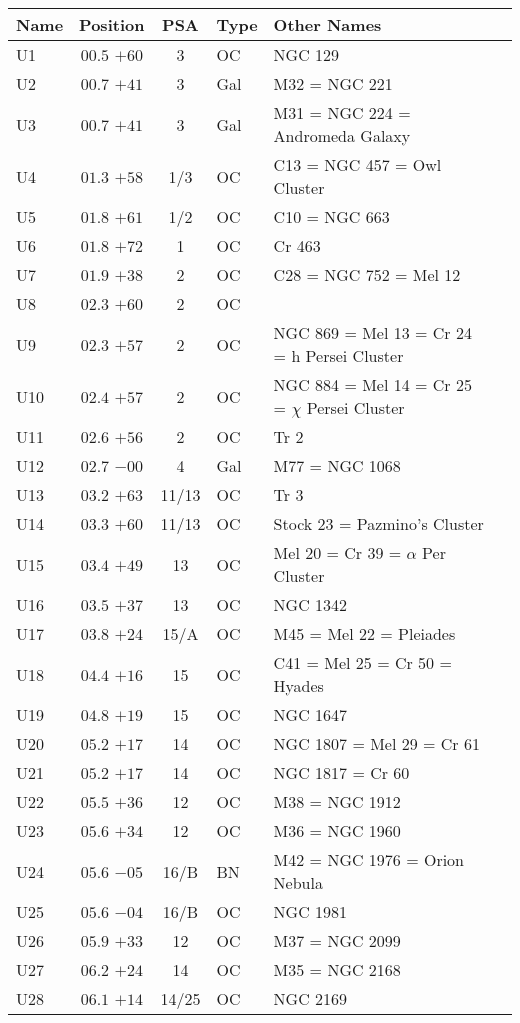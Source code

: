 \begin{table}[p]
\setlength{\tabcolsep}{3pt}
\small
\begin{tabular}{lcclll}
\hline
Name&Position&PSA&Type&Other Names\\
\hline
U1  &$00.5$ $+60$&3&OC &NGC 129\\
U2  &$00.7$ $+41$&3&Gal&M32 = NGC 221\\
U3  &$00.7$ $+41$&3&Gal&M31 = NGC 224 = Andromeda Galaxy\\
U4  &$01.3$ $+58$&1/3&OC &C13 = NGC 457 = Owl Cluster\\
U5  &$01.8$ $+61$&1/2&OC &C10 = NGC 663\\
U6  &$01.8$ $+72$&1&OC &Cr 463\\
U7  &$01.9$ $+38$&2&OC &C28 = NGC 752 = Mel 12\\
U8  &$02.3$ $+60$&2&OC &\\
U9  &$02.3$ $+57$&2&OC &NGC 869 = Mel 13 = Cr 24 = h Persei Cluster\\
U10 &$02.4$ $+57$&2&OC &NGC 884 = Mel 14 = Cr 25 = $\chi$ Persei Cluster\\
U11 &$02.6$ $+56$&2&OC &Tr 2\\
U12 &$02.7$ $-00$&4&Gal&M77 = NGC 1068\\
U13 &$03.2$ $+63$&11/13&OC &Tr 3\\
U14 &$03.3$ $+60$&11/13&OC &Stock 23 = Pazmino's Cluster\\
U15 &$03.4$ $+49$&13&OC &Mel 20 = Cr 39 = $\alpha$ Per Cluster\\
U16 &$03.5$ $+37$&13&OC &NGC 1342\\
U17 &$03.8$ $+24$&15/A&OC &M45 = Mel 22 = Pleiades\\
U18 &$04.4$ $+16$&15&OC &C41 = Mel 25 = Cr 50 = Hyades\\
U19 &$04.8$ $+19$&15&OC &NGC 1647\\
U20 &$05.2$ $+17$&14&OC &NGC 1807 = Mel 29 = Cr 61\\
U21 &$05.2$ $+17$&14&OC &NGC 1817 = Cr 60\\
U22 &$05.5$ $+36$&12&OC &M38 = NGC 1912\\
U23 &$05.6$ $+34$&12&OC &M36 = NGC 1960\\
U24 &$05.6$ $-05$&16/B&BN &M42 = NGC 1976 = Orion Nebula\\
U25 &$05.6$ $-04$&16/B&OC &NGC 1981\\
U26 &$05.9$ $+33$&12&OC &M37 = NGC 2099\\
U27 &$06.2$ $+24$&14&OC &M35 = NGC 2168\\
U28 &$06.1$ $+14$&14/25&OC &NGC 2169\\

\end{tabular}
\end{table}
